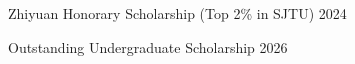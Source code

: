 
\VectraAwardEntry
    {Zhiyuan Honorary Scholarship (Top 2\% in SJTU)}
    {}
    {2024}

\VectraAwardEntry
    {Outstanding Undergraduate Scholarship}
    {}
    {2026}
